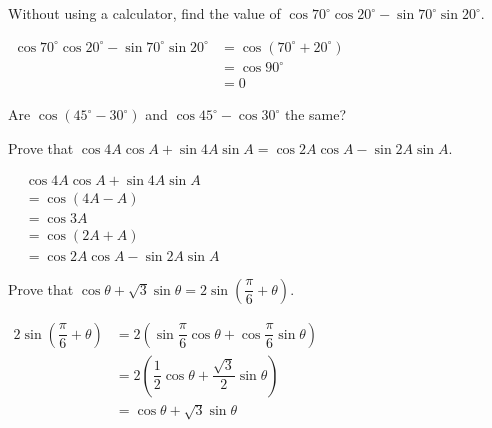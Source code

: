 \documentclass{report}
\begin{document}
\begin{question}
	Without using a calculator, find the value of $\cos 70^{\circ} \cos 20^{\circ}-\sin 70^{\circ} \sin 20^{\circ}$.
	
	\sol{}
	    
	\noindent $\begin{aligned} \cos 70^{\circ} \cos 20^{\circ}-\sin 70^{\circ} \sin 20^{\circ} & =\cos \left(70^{\circ}+20^{\circ}\right) \\ & =\cos 90^{\circ} \\ & =0\end{aligned}$
\end{question}

\begin{think}
	    
	\noindent Are $\cos \left(45^{\circ}-30^{\circ}\right)$ and $\cos 45^{\circ}-\cos 30^{\circ}$ the same?
\end{think}

\begin{question}
	Prove that $\cos 4 A \cos A+\sin 4 A \sin A=\cos 2 A \cos A-\sin 2 A \sin A$.
	
	\proof{}
	
	\noindent $\begin{aligned} & \cos 4 A \cos A+\sin 4 A \sin A \\ & =\cos (4 A-A) \\ & =\cos 3 A \\ & =\cos (2 A+A) \\ & =\cos 2 A \cos A-\sin 2 A \sin A\end{aligned}$
\end{question}

\begin{question}
	Prove that $\cos \theta+\sqrt{3} \sin \theta=2 \sin \left(\dfrac{\pi}{6}+\theta\right)$.
	
	\proof{}
	    
	\noindent $\begin{aligned} 2 \sin \left(\dfrac{\pi}{6}+\theta\right) & =2\left(\sin \dfrac{\pi}{6} \cos \theta+\cos \dfrac{\pi}{6} \sin \theta\right) \\ & =2\left(\dfrac{1}{2} \cos \theta+\dfrac{\sqrt{3}}{2} \sin \theta\right) \\ & =\cos \theta+\sqrt{3} \sin \theta\end{aligned}$
\end{question}
\end{document}
